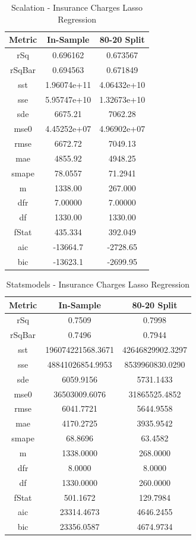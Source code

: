 \documentclass{article}
\begin{document}
\begin{table}[H]
\centering
\caption{Scalation - Insurance Charges Lasso Regression}
\label{tab:Scalation - Insurance Charges Lasso Regression}
\begin{tabular}{|c|c|c|} \hline 
Metric & In-Sample & 80-20 Split \\ \hline \hline 
rSq &0.696162 & 0.673567 \\ \hline 
rSqBar &0.694563 &      0.671849 \\ \hline 
sst &1.96074e+11 &      4.06432e+10 \\ \hline 
sse &5.95747e+10 &      1.32673e+10 \\ \hline 
sde &6675.21 &  7062.28 \\ \hline 
mse0 &4.45252e+07 &     4.96902e+07 \\ \hline 
rmse &6672.72 & 7049.13 \\ \hline 
mae &4855.92 &  4948.25 \\ \hline 
smape &78.0557 &        71.2941 \\ \hline 
m &1338.00 &    267.000 \\ \hline 
dfr &7.00000 &  7.00000 \\ \hline 
df &1330.00 &   1330.00 \\ \hline 
fStat &435.334 &        392.049 \\ \hline 
aic &-13664.7 & -2728.65 \\ \hline 
bic &-13623.1 & -2699.95 \\ \hline 
\end{tabular}
\end{table}

\begin{table}[H]
\centering
\caption{Statsmodels - Insurance Charges Lasso Regression}
\label{tab:Statsmodels - Insurance Charges Lasso Regression}
\begin{tabular}{|c|c|c|}\hline
Metric & In-Sample & 80-20 Split \\ \hline \hline
rSq & 0.7509 & 0.7998 \\ \hline
rSqBar & 0.7496 & 0.7944 \\ \hline
sst & 196074221568.3671 & 42646829902.3297 \\ \hline
sse & 48841026854.9953 & 8539960830.0290 \\ \hline
sde & 6059.9156 & 5731.1433 \\ \hline
mse0 & 36503009.6076 & 31865525.4852 \\ \hline
rmse & 6041.7721 & 5644.9558 \\ \hline
mae & 4170.2725 & 3935.9542 \\ \hline
smape & 68.8696 & 63.4582 \\ \hline
m & 1338.0000 & 268.0000 \\ \hline
dfr & 8.0000 & 8.0000 \\ \hline
df & 1330.0000 & 260.0000 \\ \hline
fStat & 501.1672 & 129.7984 \\ \hline
aic & 23314.4673 & 4646.2455 \\ \hline
bic & 23356.0587 & 4674.9734 \\ \hline
\end{tabular}
\end{table}
\end{document}

